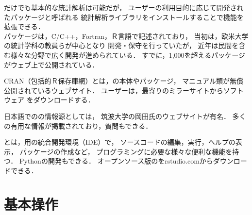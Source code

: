{
  \R だけでも基本的な統計解析は可能だが，
  ユーザーの利用目的に応じて開発された\R パッケージと呼ばれる
  統計解析ライブラリをインストールすることで機能を拡張できる．\\
  
  \R パッケージは，C/C++，Fortran，Ｒ言語で記述されており，
  当初は，欧米大学の統計学科の教員らが中心となり
  開発・保守を行っていたが，
  近年は民間を含む様々な分野で広く開発が進められている．
  すでに，1,000を超える\R パッケージがウェブ上で公開されている．
}

{
  CRAN（包括的Ｒ保存庫網）とは，\R の本体やパッケージ，
  マニュアル類が無償公開されているウェブサイト．
  ユーザーは，最寄りのミラーサイトからソフトウェア
  をダウンロードする．\\[3mm]

}

{
  日本語での\R の情報源としては，
筑波大学の岡田氏のウェブサイトが有名．
  多くの有用な情報が掲載されており，質問もできる．\\

}

{
  \RS とは，\R 用の統合開発環境（IDE）で，
  ソースコードの編集，実行，ヘルプの表示，
  パッケージの作成など，
  プログラミングに必要な様々な便利な機能を持つ．
  Pythonの開発もできる．
  オープンソース版の\RS をrstudio.comからダウンロードできる． 
}

\section{基本操作}

